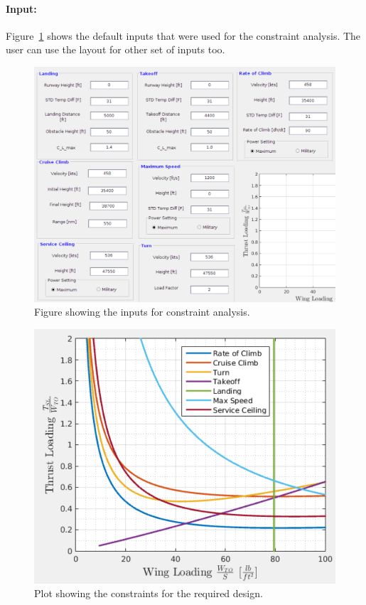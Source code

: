 \documentclass[pdftex,11pt,letter]{article}
\begin{document}
\paragraph{Input:}
Figure~\ref{input_con} shows the default inputs that were used for the constraint analysis. The user can use the layout for other set of inputs too.
\begin{figure}[h!]
\centering
	\includegraphics[scale=0.6]{figures/con_input.pdf}
        \caption{Figure showing the inputs for constraint analysis.}
\label{input_con}
\end{figure}
\begin{figure}[h!]
\centering
	\includegraphics[scale=0.6]{figures/constraint_plot.pdf}
        \caption{Plot showing the constraints for the required design.}
\label{constraint_plot}
\end{figure}
\end{document}
